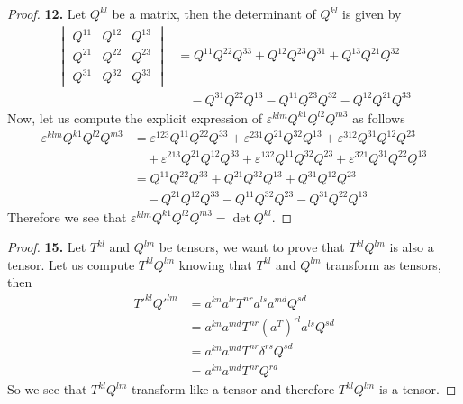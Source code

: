 \documentclass[11pt]{article}
\theoremstyle{definition}
\begin{document}
\cleardoublepage
\begin{proof}{\textbf{12.}}
    Let $Q^{kl}$ be a matrix, then the determinant of $Q^{kl}$ is given by
    \begin{align*}
        \begin{vmatrix}
            Q^{11} & Q^{12} & Q^{13}\\
            Q^{21} & Q^{22} & Q^{23}\\
            Q^{31} & Q^{32} & Q^{33}
        \end{vmatrix}
        &= Q^{11}Q^{22}Q^{33} + Q^{12}Q^{23}Q^{31} + Q^{13}Q^{21}Q^{32}\\
        &\quad - Q^{31}Q^{22}Q^{13} - Q^{11}Q^{23}Q^{32} - Q^{12}Q^{21}Q^{33}
    \end{align*}
    Now, let us compute the explicit expression of
    $\varepsilon^{klm}Q^{k1}Q^{l2}Q^{m3}$ as follows
    \begin{align*}
        \varepsilon^{klm}Q^{k1}Q^{l2}Q^{m3}
        &= \varepsilon^{123}Q^{11}Q^{22}Q^{33}  + \varepsilon^{231}Q^{21}Q^{32}Q^{13}
        + \varepsilon^{312} Q^{31}Q^{12}Q^{23}\\
        &\quad + \varepsilon^{213}Q^{21}Q^{12}Q^{33} + \varepsilon^{132}Q^{11}Q^{32}Q^{23}
        + \varepsilon^{321} Q^{31}Q^{22}Q^{13}\\
        &= Q^{11}Q^{22}Q^{33}  + Q^{21}Q^{32}Q^{13} + Q^{31}Q^{12}Q^{23}\\
        &\quad - Q^{21}Q^{12}Q^{33} - Q^{11}Q^{32}Q^{23}
        - Q^{31}Q^{22}Q^{13}
    \end{align*}
    Therefore we see that $\varepsilon^{klm}Q^{k1}Q^{l2}Q^{m3} = \det{Q^{kl}}$.
\end{proof}
\begin{proof}{\textbf{15.}}
    Let $T^{kl}$ and $Q^{lm}$ be tensors, we want to prove that $T^{kl}Q^{lm}$
    is also a tensor. Let us compute $T^{kl}Q^{lm}$ knowing that $T^{kl}$
    and $Q^{lm}$ transform as tensors, then
    \begin{align*}
        T'^{kl}Q'^{lm} &= a^{kn}a^{lr}T^{nr} a^{ls}a^{md}Q^{sd}\\
            &= a^{kn}a^{md}T^{nr}(a^{T})^{rl} a^{ls}Q^{sd}\\
            &= a^{kn}a^{md}T^{nr}\delta^{rs}Q^{sd}\\
            &= a^{kn}a^{md}T^{nr}Q^{rd}
    \end{align*}
    So we see that $T^{kl}Q^{lm}$ transform like a tensor and therefore
    $T^{kl}Q^{lm}$ is a tensor.
\end{proof}
\end{document}

